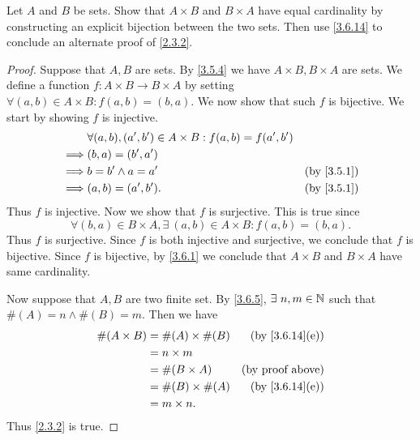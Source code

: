 \begin{ex}\label{ex:3.6.5}
  Let \(A\) and \(B\) be sets.
  Show that \(A \times B\) and \(B \times A\) have equal cardinality by constructing an explicit bijection between the two sets.
  Then use \cref{3.6.14} to conclude an alternate proof of \cref{2.3.2}.
\end{ex}

\begin{proof}
  Suppose that \(A, B\) are sets.
  By \cref{3.5.4} we have \(A \times B, B \times A\) are sets.
  We define a function \(f : A \times B \to B \times A\) by setting \(\forall (a, b) \in A \times B : f(a, b) = (b, a)\).
  We now show that such \(f\) is bijective.
  We start by showing \(f\) is injective.
  \begin{align*}
             & \forall (a, b), (a', b') \in A \times B : f(a, b) = f(a', b')                            \\
    \implies & (b, a) = (b', a')                                                                        \\
    \implies & b = b' \land a = a'                                           & \text{(by \cref{3.5.1})} \\
    \implies & (a, b) = (a', b').                                            & \text{(by \cref{3.5.1})}
  \end{align*}
  Thus \(f\) is injective.
  Now we show that \(f\) is surjective.
  This is true since
  \[
    \forall (b, a) \in B \times A, \exists\ (a, b) \in A \times B : f(a, b) = (b, a).
  \]
  Thus \(f\) is surjective.
  Since \(f\) is both injective and surjective, we conclude that \(f\) is bijective.
  Since \(f\) is bijective, by \cref{3.6.1} we conclude that \(A \times B\) and \(B \times A\) have same cardinality.

  Now suppose that \(A, B\) are two finite set.
  By \cref{3.6.5}, \(\exists\ n, m \in \N\) such that \(\#(A) = n \land \#(B) = m\).
  Then we have
  \begin{align*}
    \#(A \times B) & = \#(A) \times \#(B) & \text{(by \cref{3.6.14}(e))} \\
                   & = n \times m                                        \\
                   & = \#(B \times A)     & \text{(by proof above)}      \\
                   & = \#(B) \times \#(A) & \text{(by \cref{3.6.14}(e))} \\
                   & = m \times n.
  \end{align*}
  Thus \cref{2.3.2} is true.
\end{proof}

